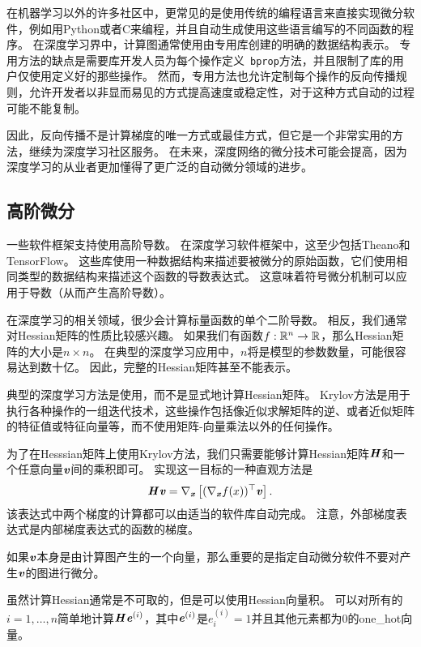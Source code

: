 在机器学习以外的许多社区中，更常见的是使用传统的编程语言来直接实现微分软件，例如用Python或者C来编程，并且自动生成使用这些语言编写的不同函数的程序。
在深度学习界中，计算图通常使用由专用库创建的明确的数据结构表示。
专用方法的缺点是需要库开发人员为每个操作定义~\verb|bprop|方法，并且限制了库的用户仅使用定义好的那些操作。
然而，专用方法也允许定制每个操作的反向传播规则，允许开发者以非显而易见的方式提高速度或稳定性，对于这种方式自动的过程可能不能复制。

因此，反向传播不是计算梯度的唯一方式或最佳方式，但它是一个非常实用的方法，继续为深度学习社区服务。 
在未来，深度网络的微分技术可能会提高，因为深度学习的从业者更加懂得了更广泛的自动微分领域的进步。
  
  
\subsection{高阶微分}
\label{sec:higher_order_derivatives}

一些软件框架支持使用高阶导数。 
在深度学习软件框架中，这至少包括Theano和TensorFlow。
这些库使用一种数据结构来描述要被微分的原始函数，它们使用相同类型的数据结构来描述这个函数的导数表达式。
这意味着符号微分机制可以应用于导数（从而产生高阶导数）。

在深度学习的相关领域，很少会计算标量函数的单个二阶导数。
相反，我们通常对Hessian矩阵的性质比较感兴趣。
如果我们有函数$f:\mathbb{R}^n \to \mathbb{R}$，那么Hessian矩阵的大小是$n\times n$。
在典型的深度学习应用中，$n$将是模型的参数数量，可能很容易达到数十亿。
因此，完整的Hessian矩阵甚至不能表示。

典型的深度学习方法是使用，而不是显式地计算Hessian矩阵。
Krylov方法是用于执行各种操作的一组迭代技术，这些操作包括像近似求解矩阵的逆、或者近似矩阵的特征值或特征向量等，而不使用矩阵-向量乘法以外的任何操作。

为了在Hesssian矩阵上使用Krylov方法，我们只需要能够计算Hessian矩阵$\boldsymbol{\mathit{H}}$和一个任意向量$\boldsymbol{\mathit{v}}$间的乘积即可。
实现这一目标的一种直观方法\citep{christianson1992automatic}是
\begin{equation}
  \boldsymbol{\mathit{H}} \boldsymbol{\mathit{v}}=\nabla_{\boldsymbol{\mathit{x}}} \left [ (\nabla_{\boldsymbol{\mathit{x}}} f(x))^\top \boldsymbol{\mathit{v}}\right ].
\end{equation}
该表达式中两个梯度的计算都可以由适当的软件库自动完成。
注意，外部梯度表达式是内部梯度表达式的函数的梯度。

如果$\boldsymbol{\mathit{v}}$本身是由计算图产生的一个向量，那么重要的是指定自动微分软件不要对产生$\boldsymbol{\mathit{v}}$的图进行微分。

虽然计算Hessian通常是不可取的，但是可以使用Hessian向量积。
可以对所有的$i=1,\ldots,n$简单地计算$\boldsymbol{\mathit{H}} \boldsymbol{\mathit{e}}^{(i)}$，其中$\boldsymbol{\mathit{e}}^{(i)}$是$e_i^{(i)}=1$并且其他元素都为0的\gls{one_hot}向量。

